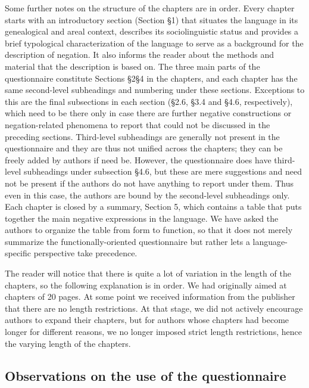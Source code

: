 \documentclass[output=paper,colorlinks,citecolor=brown]{langscibook}
\begin{document}
Some further notes on the structure of the chapters are in order. Every chapter starts with an introductory section (Section §1) that situates the language in its genealogical and areal context, describes its sociolinguistic status and provides a brief typological characterization of the language to serve as a background for the description of negation. It also informs the reader about the methods and material that the description is based on. The three main parts of the questionnaire constitute Sections §2\textemdash§4 in the chapters, and each chapter has the same second-level subheadings and numbering under these sections. Exceptions to this are the final subsections in each section (§2.6, §3.4 and §4.6, respectively), which need to be there only in case there are further negative constructions or negation-related phenomena to report that could not be discussed in the preceding sections. Third-level subheadings are generally not present in the questionnaire and they are thus not unified across the chapters; they can be freely added by authors if need be. However, the questionnaire does have third-level subheadings under subsection §4.6, but these are mere suggestions and need not be present if the authors do not have anything to report under them. Thus even in this case, the authors are bound by the second-level subheadings only. Each chapter is closed by a summary, Section 5, which contains a table that puts together the main negative expressions in the language. We have asked the authors to organize the table from form to function, so that it does not merely summarize the functionally-oriented questionnaire but rather lets a language-specific perspective take precedence.

The reader will notice that there is quite a lot of variation in the length of the chapters, so the following explanation is in order. We had originally aimed at chapters of 20 pages. At some point we received information from the publisher that there are no length restrictions. At that stage, we did not actively encourage authors to expand their chapters, but for authors whose chapters had become longer for different reasons, we no longer imposed strict length restrictions, hence the varying length of the chapters. 

\subsection{Observations on the use of the questionnaire}\label{section2.2:observations-on-questionnaire}
\end{document}
